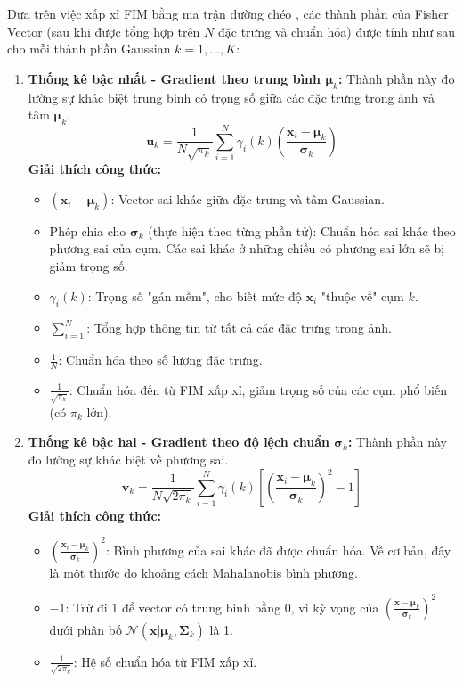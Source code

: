 Dựa trên việc xấp xỉ FIM bằng ma trận đường chéo \cite{Sanchez2013}, các thành phần của Fisher Vector (sau khi được tổng hợp trên $N$ đặc trưng và chuẩn hóa) được tính như sau cho mỗi thành phần Gaussian $k=1, ..., K$:

\begin{enumerate}
    \item \textbf{Thống kê bậc nhất - Gradient theo trung bình $\boldsymbol{\mu}_k$:}
    Thành phần này đo lường sự khác biệt trung bình có trọng số giữa các đặc trưng trong ảnh và tâm $\boldsymbol{\mu}_k$.
    \begin{equation}
        \mathbf{u}_k = \frac{1}{N \sqrt{\pi_k}} \sum_{i=1}^{N} \gamma_i(k) \left( \frac{\mathbf{x}_i - \boldsymbol{\mu}_k}{\boldsymbol{\sigma}_k} \right)
        \label{eq:fv_mean_grad_detailed}
    \end{equation}
    \textbf{Giải thích công thức:}
    \begin{itemize}
        \item $(\mathbf{x}_i - \boldsymbol{\mu}_k)$: Vector sai khác giữa đặc trưng và tâm Gaussian.
        \item Phép chia cho $\boldsymbol{\sigma}_k$ (thực hiện theo từng phần tử): Chuẩn hóa sai khác theo phương sai của cụm. Các sai khác ở những chiều có phương sai lớn sẽ bị giảm trọng số.
        \item $\gamma_i(k)$: Trọng số "gán mềm", cho biết mức độ $\mathbf{x}_i$ "thuộc về" cụm $k$.
        \item $\sum_{i=1}^{N}$: Tổng hợp thông tin từ tất cả các đặc trưng trong ảnh.
        \item $\frac{1}{N}$: Chuẩn hóa theo số lượng đặc trưng.
        \item $\frac{1}{\sqrt{\pi_k}}$: Chuẩn hóa đến từ FIM xấp xỉ, giảm trọng số của các cụm phổ biến (có $\pi_k$ lớn).
    \end{itemize}

    \item \textbf{Thống kê bậc hai - Gradient theo độ lệch chuẩn $\boldsymbol{\sigma}_k$:}
    Thành phần này đo lường sự khác biệt về phương sai.
    \begin{equation}
        \mathbf{v}_k = \frac{1}{N \sqrt{2\pi_k}} \sum_{i=1}^{N} \gamma_i(k) \left[ \left(\frac{\mathbf{x}_i - \boldsymbol{\mu}_k}{\boldsymbol{\sigma}_k}\right)^2 - 1 \right]
        \label{eq:fv_std_grad_detailed}
    \end{equation}
    \textbf{Giải thích công thức:}
    \begin{itemize}
        \item $\left(\frac{\mathbf{x}_i - \boldsymbol{\mu}_k}{\boldsymbol{\sigma}_k}\right)^2$: Bình phương của sai khác đã được chuẩn hóa. Về cơ bản, đây là một thước đo khoảng cách Mahalanobis bình phương.
        \item $-1$: Trừ đi 1 để vector có trung bình bằng 0, vì kỳ vọng của $\left(\frac{\mathbf{x} - \boldsymbol{\mu}_k}{\boldsymbol{\sigma}_k}\right)^2$ dưới phân bố $\mathcal{N}(\mathbf{x} | \boldsymbol{\mu}_k, \boldsymbol{\Sigma}_k)$ là 1.
        \item $\frac{1}{\sqrt{2\pi_k}}$: Hệ số chuẩn hóa từ FIM xấp xỉ.
    \end{itemize}
\end{enumerate}

